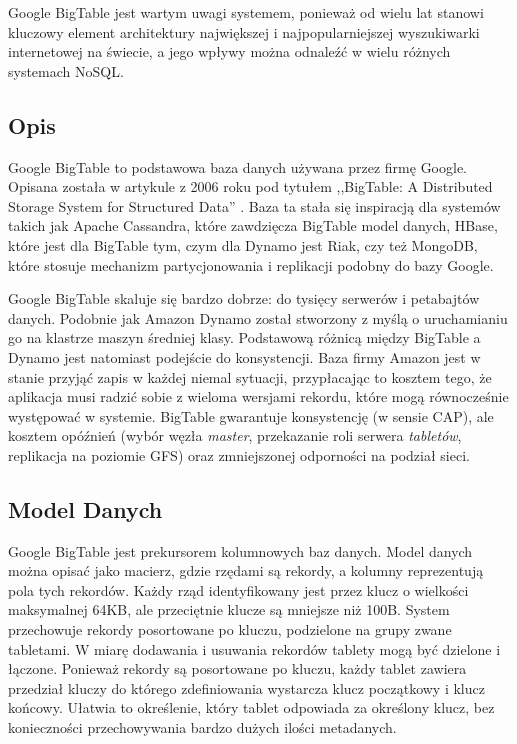 Google BigTable jest wartym uwagi systemem, ponieważ od wielu lat stanowi kluczowy element architektury największej i najpopularniejszej wyszukiwarki internetowej na świecie, a jego wpływy można odnaleźć w wielu różnych systemach NoSQL.

\subsection*{Opis}

Google BigTable to podstawowa baza danych używana przez firmę Google.
Opisana została w artykule z 2006 roku pod tytułem ,,BigTable: A Distributed Storage System for Structured Data'' \cite{google-bigtable}.
Baza ta stała się inspiracją dla systemów takich jak Apache Cassandra, które zawdzięcza BigTable model danych, HBase, które jest dla BigTable tym, czym dla Dynamo jest Riak, czy też MongoDB, które stosuje mechanizm partycjonowania i replikacji podobny do bazy Google.

Google BigTable skaluje się bardzo dobrze: do tysięcy serwerów i petabajtów danych.
Podobnie jak Amazon Dynamo został stworzony z myślą o uruchamianiu go na klastrze maszyn średniej klasy.
Podstawową różnicą między BigTable a Dynamo jest natomiast podejście do konsystencji.
Baza firmy Amazon jest w stanie przyjąć zapis w każdej niemal sytuacji, przypłacając to kosztem tego, że aplikacja musi radzić sobie z wieloma wersjami rekordu, które mogą równocześnie występować w systemie.
BigTable gwarantuje konsystencję (w sensie CAP), ale kosztem opóźnień (wybór węzła \emph{master}, przekazanie roli serwera \emph{tabletów}, replikacja na poziomie GFS) oraz zmniejszonej odporności na podział sieci.

\subsection*{Model Danych}
\label{google-bigtable-model-danych}

Google BigTable jest prekursorem kolumnowych baz danych.
Model danych można opisać jako macierz, gdzie rzędami są rekordy, a kolumny reprezentują pola tych rekordów.
Każdy rząd identyfikowany jest przez klucz o wielkości maksymalnej 64KB, ale przeciętnie klucze są mniejsze niż 100B.
System przechowuje rekordy posortowane po kluczu, podzielone na grupy zwane tabletami.
W miarę dodawania i usuwania rekordów tablety mogą być dzielone i łączone.
Ponieważ rekordy są posortowane po kluczu, każdy tablet zawiera przedział kluczy do którego zdefiniowania wystarcza klucz początkowy i klucz końcowy.
Ułatwia to określenie, który tablet odpowiada za określony klucz, bez konieczności przechowywania bardzo dużych ilości metadanych.

